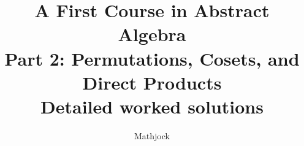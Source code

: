 
\title{\textbf{A First Course in Abstract Algebra}\\[0.3em]Part 2: Permutations, Cosets, and Direct Products\\[0.3em]\large Detailed worked solutions}
\author{Mathjock}
\date{}

\maketitle
\bookinfo
\tableofcontents
\clearpage
\renewcommand{\thesection}{8}
\renewcommand{\theHsection}{fraleigh.8}

\clearpage
\renewcommand{\thesection}{9}
\renewcommand{\theHsection}{fraleigh.9}

\clearpage
\renewcommand{\thesection}{10}
\renewcommand{\theHsection}{fraleigh.10}

\clearpage
\renewcommand{\thesection}{11}
\renewcommand{\theHsection}{fraleigh.11}

\clearpage
\renewcommand{\thesection}{12}
\renewcommand{\theHsection}{fraleigh.12}


